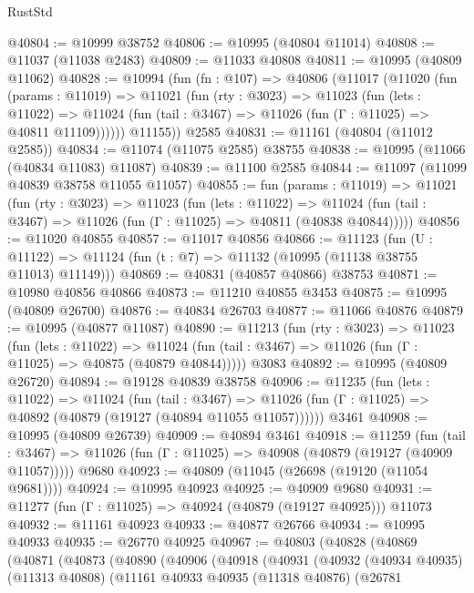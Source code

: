 \begin{lexlean}{RustStd}
\begin{coremodule}
@40804 := @10999 @38752
@40806 := @10995 (@40804 @11014)
@40808 := @11037 (@11038 @2483)
@40809 := @11033 @40808
@40811 := @10995 (@40809 @11062)
@40828 := @10994
    (fun (fn : @107) =>
    @40806
      (@11017
        (@11020
          (fun (params : @11019) =>
          @11021
            (fun (rty : @3023) =>
            @11023
              (fun (lets : @11022) =>
              @11024 (fun (tail : @3467) => @11026 (fun (Γ : @11025) => @40811 @11109))))))
        @11155))
    @2585
@40831 := @11161 (@40804 (@11012 @2585))
@40834 := @11074 (@11075 @2585) @38755
@40838 := @10995 (@11066 (@40834 @11083) @11087)
@40839 := @11100 @2585
@40844 := @11097 (@11099 @40839 @38758 @11055 @11057)
@40855 := fun (params : @11019) =>
  @11021
    (fun (rty : @3023) =>
    @11023
      (fun (lets : @11022) =>
      @11024 (fun (tail : @3467) => @11026 (fun (Γ : @11025) => @40811 (@40838 @40844)))))
@40856 := @11020 @40855
@40857 := @11017 @40856
@40866 := @11123
    (fun (U : @11122) => @11124 (fun (t : @7) => @11132 (@10995 (@11138 @38755 @11013) @11149)))
@40869 := @40831 (@40857 @40866) @38753
@40871 := @10980 @40856 @40866
@40873 := @11210 @40855 @3453
@40875 := @10995 (@40809 @26700)
@40876 := @40834 @26703
@40877 := @11066 @40876
@40879 := @10995 (@40877 @11087)
@40890 := @11213
    (fun (rty : @3023) =>
    @11023
      (fun (lets : @11022) =>
      @11024 (fun (tail : @3467) => @11026 (fun (Γ : @11025) => @40875 (@40879 @40844)))))
    @3083
@40892 := @10995 (@40809 @26720)
@40894 := @19128 @40839 @38758
@40906 := @11235
    (fun (lets : @11022) =>
    @11024
      (fun (tail : @3467) =>
      @11026 (fun (Γ : @11025) => @40892 (@40879 (@19127 (@40894 @11055 @11057))))))
    @3461
@40908 := @10995 (@40809 @26739)
@40909 := @40894 @3461
@40918 := @11259
    (fun (tail : @3467) => @11026 (fun (Γ : @11025) => @40908 (@40879 (@19127 (@40909 @11057)))))
    @9680
@40923 := @40809 (@11045 (@26698 (@19120 (@11054 @9681))))
@40924 := @10995 @40923
@40925 := @40909 @9680
@40931 := @11277 (fun (Γ : @11025) => @40924 (@40879 (@19127 @40925))) @11073
@40932 := @11161 @40923
@40933 := @40877 @26766
@40934 := @10995 @40933
@40935 := @26770 @40925
@40967 := @40803
    (@40828
      (@40869
        (@40871
          (@40873
            (@40890
              (@40906
                (@40918
                  (@40931
                    (@40932
                      (@40934 @40935)
                      (@11313 @40808)
                      (@11161
                        @40933
                        @40935
                        (@11318 @40876)
                        (@26781

\end{coremodule}
\end{lexlean}
